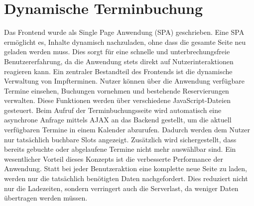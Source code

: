 \section*{Dynamische Terminbuchung}
Das Frontend wurde als Single Page Anwendung (SPA) geschrieben. Eine SPA ermöglicht es, 
Inhalte dynamisch nachzuladen, ohne dass die gesamte Seite neu geladen werden muss. Dies 
sorgt für eine schnelle und unterbrechungsfreie Benutzererfahrung, da die Anwendung stets 
direkt auf Nutzerinteraktionen reagieren kann.
Ein zentraler Bestandteil des Frontends ist die dynamische Verwaltung von Impfterminen. 
Nutzer können über die Anwendung verfügbare Termine einsehen, Buchungen vornehmen und 
bestehende Reservierungen verwalten. Diese Funktionen werden über verschiedene 
JavaScript-Dateien gesteuert.
Beim Aufruf der Terminbuchungsseite wird automatisch eine asynchrone Anfrage mittels AJAX
an das Backend gestellt, um die aktuell verfügbaren Termine in einem Kalender abzurufen. 
Dadurch werden dem Nutzer nur tatsächlich buchbare Slots angezeigt. Zusätzlich wird 
sichergestellt, dass bereits gebuchte oder abgelaufene Termine nicht mehr auswählbar sind.
Ein wesentlicher Vorteil dieses Konzepts ist die verbesserte Performance der Anwendung. 
Statt bei jeder Benutzeraktion eine komplette neue Seite zu laden, werden nur die 
tatsächlich benötigten Daten nachgefordert. Dies reduziert nicht nur die Ladezeiten, 
sondern verringert auch die Serverlast, da weniger Daten übertragen werden müssen. 
